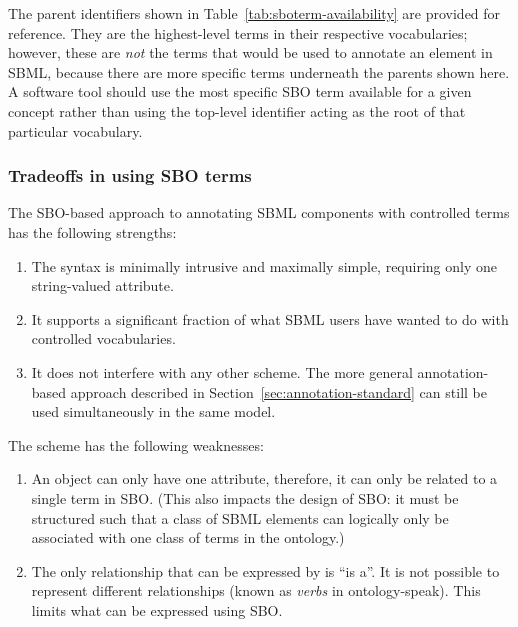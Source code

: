 The parent identifiers shown in
Table~\ref{tab:sboterm-availability} are provided for reference.
They are the highest-level terms in their respective vocabularies;
however, these are \emph{not} the terms that would be used to
annotate an element in SBML, because there are more specific terms
underneath the parents shown here.  A software tool should use the
most specific SBO term available for a given concept rather than
using the top-level identifier acting as the root of that
particular vocabulary.




\subsubsection{Tradeoffs in using SBO terms}

The SBO-based approach to annotating SBML components with
controlled terms has the following strengths:
\begin{enumerate}

\item The syntax is minimally intrusive and maximally simple,
  requiring only one string-valued attribute.

\item It supports a significant fraction of what SBML users have wanted
  to do with controlled vocabularies.

\item It does not interfere with any other scheme.  The more
  general annotation-based approach described in
  Section~\ref{sec:annotation-standard} can still be used
  simultaneously in the same model.

\end{enumerate}

The scheme has the following weaknesses:
\begin{enumerate}

\item An object can only have one  attribute,
  therefore, it can only be related to a single term in SBO.
  (This also impacts the design of SBO: it must be structured such
  that a class of SBML elements can logically only be associated
  with one class of terms in the ontology.)

\item The only relationship that can be expressed by
   is ``is a''.  It is not possible to represent
  different relationships (known as \emph{verbs} in
  ontology-speak).  This limits what can be expressed using SBO.

\end{enumerate}

